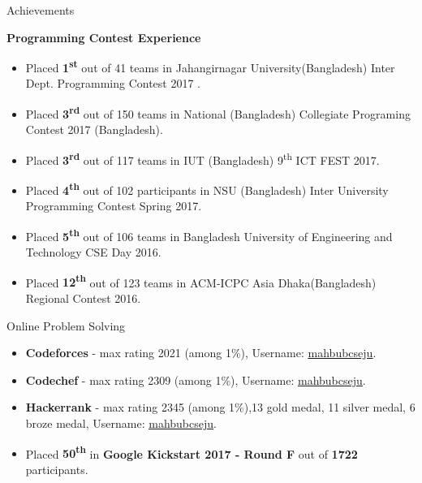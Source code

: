 \documentclass[]{mcdowellcv}
\def\first{8pt}
\begin{document}
		\begin{cvsection}{Achievements}
		\begin{cvsubsection}{}{}{}
		    \begin{description}
		     \vspace*{\first}
		     \hspace*{-8pt}\textbf{Programming Contest Experience}
		    \end{description}
			\begin{itemize}
				\item Placed \textbf{1\textsuperscript{st}} out of 41 teams in Jahangirnagar University(Bangladesh) Inter Dept. Programming Contest 2017 .
				\item Placed \textbf{3\textsuperscript{rd}} out of 150 teams in National (Bangladesh) Collegiate Programing Contest 2017 (Bangladesh).
				\item Placed \textbf{3\textsuperscript{rd}} out of 117 teams in IUT (Bangladesh) 9\textsuperscript{th} ICT FEST 2017.
				\item Placed \textbf{4\textsuperscript{th}} out of 102 participants in NSU (Bangladesh) Inter University Programming Contest Spring 2017.
				\item Placed \textbf{5\textsuperscript{th}} out of 106 teams in Bangladesh University of Engineering and Technology CSE Day 2016.
				\item Placed \textbf{12\textsuperscript{th}} out of 123 teams in ACM-ICPC Asia Dhaka(Bangladesh) Regional Contest 2016.
			\end{itemize}
		\end{cvsubsection}
		\begin{cvsubsection}{\hspace*{\first}Online Problem Solving}{}{}
			\begin{itemize}
			    \item \textbf{Codeforces} - max rating 2021 (among 1\%), Username: \href{https://codeforces.com/profile/mahbubcseju}{\underline{mahbubcseju}}.
			     \item \textbf{Codechef} - max rating 2309 (among 1\%), Username: \href{https://www.codechef.com/users/mahbubcseju}{\underline{mahbubcseju}}.
			     \item \textbf{Hackerrank} - max rating 2345 (among 1\%),13 gold medal, 11 silver medal, 6 broze medal, Username: \href{https://www.hackerrank.com/profile/mahbubcseju}{\underline{mahbubcseju}}.
			    \item Placed \textbf{50\textsuperscript{th}} in \textbf{Google Kickstart 2017 - Round F} out of \textbf{1722} participants.
			\end{itemize}
		\end{cvsubsection}
	\end{cvsection}
\end{document}
